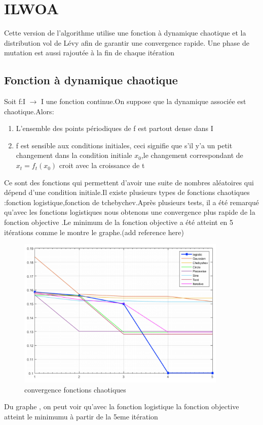 \documentclass[12pt]{article}
\begin{document}
\section{ILWOA}
    Cette version de l'algorithme utilise une fonction à dynamique chaotique et la distribution vol de Lévy afin de garantir une convergence rapide. Une phase de mutation est aussi rajoutée à la fin de chaque itération
\subsection{Fonction à dynamique chaotique}
Soit f:I $\rightarrow$ I une fonction continue.On suppose que la dynamique associée est chaotique.Alors:
\begin{enumerate}
    \item L'ensemble des points périodiques de f est partout dense dans I 
    \item f est sensible aux conditions initiales, ceci signifie que s'il y'a un petit changement dans la condition initiale $x_0$,le changement correspondant de $x_t=f_t(x_0)$ croit avec la croissance de t 
\end{enumerate}
Ce sont des fonctions qui permettent d'avoir une suite de nombres aléatoires qui dépend d'une condition initiale.Il existe plusieurs types de fonctions chaotiques :fonction logistique,fonction de tchebychev.Après plusieurs tests, il a été remarqué qu'avec les fonctions logistiques nous obtenons une convergence plus rapide de la fonction objective .Le minimum de la fonction objective a été atteint en 5 itérations comme le montre le graphe.(add reference here)
\begin{figure}[h!]
   \centering
    \includegraphics[width=10cm]{../figures/logisticvsothers.PNG}
    \caption{convergence fonctions chaotiques}
\end{figure}
Du graphe , on peut voir qu'avec la fonction logistique la fonction objective atteint le minimumu à partir de la 5eme itération
\end{document}
